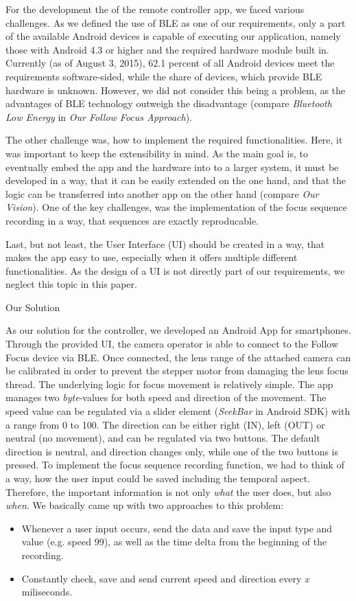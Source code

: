 \documentclass{sigchi}
\begin{document}
For the development the of the remote controller app, we faced various challenges. As we defined the use of BLE as one of our requirements, only a part of the available Android devices is capable of executing our application, namely those with Android 4.3 or higher and the required hardware module built in. Currently (as of August 3, 2015), 62.1 percent of all Android devices meet the requirements software-sided, while the share of devices, which provide BLE hardware is unknown. \cite{devand} However, we did not consider this being a problem, as the advantages of BLE technology outweigh the disadvantage (compare \textit{Bluetooth Low Energy} in \textit{Our Follow Focus Approach}).

The other challenge was, how to implement the required functionalities. Here, it was important to keep the extensibility in mind. As the main goal is, to eventually embed the app and the hardware into to a larger system, it must be developed in a way, that it can be easily extended on the one hand, and that the logic can be transferred into another app on the other hand (compare \textit{Our Vision}). One of the key challenges, was the implementation of the focus sequence recording in a way, that sequences are exactly reproducable. 

Last, but not least, the User Interface (UI) should be created in a way, that makes the app easy to use, especially when it offers multiple different functionalities. As the design of a UI is not directly part of our requirements, we neglect this topic in this paper. 


Our Solution

As our solution for the controller, we developed an Android App for smartphones. Through the provided UI, the camera operator is able to connect to the Follow Focus device via BLE. 
Once connected, the lens range of the attached camera can be calibrated in order to prevent the stepper motor from damaging the lens focus thread.
The underlying logic for focus movement is relatively simple. The app manages two \textit{byte}-values for both speed and direction of the movement.
The speed value can be regulated via a slider element (\textit{SeekBar} in Android SDK) with a range from 0 to 100. The direction can be either right (IN), left (OUT) or neutral (no movement), and can be regulated via two buttons. The default direction is neutral, and direction changes only, while one of the two buttons is pressed.  \newline
To implement the focus sequence recording function, we had to think of a way, how the user input could be saved including the temporal aspect. Therefore, the important information is not only \textit{what} the user does, but also \textit{when}. We basically came up with two approaches to this problem: \newline
\begin{itemize}
  \item Whenever a user input occurs, send the data and save the input type and value (e.g. speed 99), as well as the time delta from the beginning of the recording.
  \item Constantly check, save and send current speed and direction every \textit{x} miliseconds.
\end{itemize}
\end{document}
